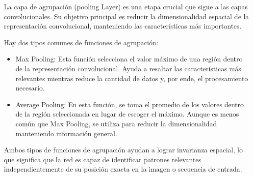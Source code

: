 La capa de agrupación (pooling Layer) es una etapa crucial que sigue a las capas convolucionales. Su objetivo principal es reducir la dimensionalidad espacial de la representación convolucional, manteniendo las características más importantes.

Hay dos tipos comunes de funciones de agrupación:

\begin{itemize}
	
	\item Max Pooling: Esta función selecciona el valor máximo de una región dentro de la representación convolucional. Ayuda a resaltar las características más relevantes mientras reduce la cantidad de datos y, por ende, el procesamiento necesario.
	
	\item Average Pooling: En esta función, se toma el promedio de los valores dentro de la región seleccionada en lugar de escoger el máximo. Aunque es menos común que Max Pooling, se utiliza para reducir la dimensionalidad manteniendo información general.
	
\end{itemize}

Ambos tipos de funciones de agrupación ayudan a lograr invarianza espacial, lo que significa que la red es capaz de identificar patrones relevantes independientemente de su posición exacta en la imagen o secuencia de entrada.

